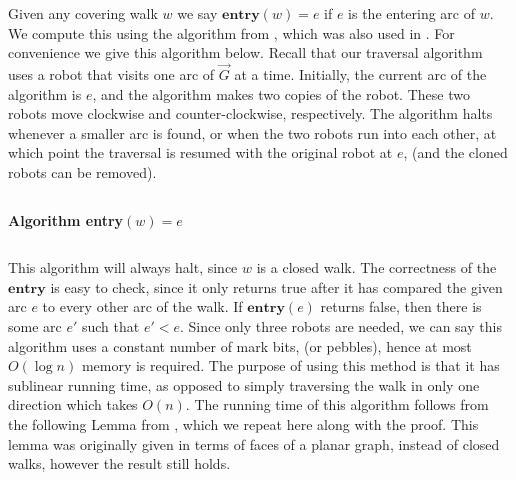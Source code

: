 \documentclass[12pt,letterpaper,oneside]{book}
\newcommand{\suc}{\textbf{succ}}
\newcommand{\pred}{\textbf{pred}}
\newcommand{\entry}{\textbf{entry}}
\begin{document}
Given any covering walk $w$ we say $\entry(w)=e$ if $e$ is the entering 
arc of $w$.  We compute this using the algorithm from \cite{BM}, which was also used in \cite{CDKOSU}.  For convenience 
we give this algorithm below.  Recall that our traversal algorithm uses a robot that visits 
one arc of $\vec{G}$ at a time.  Initially, the current arc of the algorithm is $e$, and the algorithm makes two 
copies of the robot.  These two robots move clockwise and counter-clockwise, respectively.  The algorithm halts whenever a smaller 
arc is found, or when the two robots run into each other, at which point the traversal is resumed with 
the original robot at $e$, (and the cloned robots can be removed).   
 



\begin{center}\begin{tabular*}{\textwidth}{c}\hline\end{tabular*}\end{center}
\noindent \textbf{Algorithm entry}$(w)=e$
\begin{algorithmic}[1]
\REPEAT
 \STATE {$e^{cw} \leftarrow \pred(e^{cw})$}
  \ELSE
     \ENDIF
\ENDIF 


 \STATE {$e^{ccw} \leftarrow \suc(e^{ccw})$}
  \ELSE
      \ENDIF
   \ENDIF 

\end{algorithmic}
\begin{center}\begin{tabular*}{\textwidth}{c}\hline\end{tabular*}\end{center}

This algorithm will always halt, since $w$ is a closed walk.  
The correctness of the $\entry$ is easy to check, since it only returns true after it has compared the given arc 
$e$ to every other arc of the walk.  If $\entry(e)$ returns false, then there is some arc $e'$ such that $e'<e$.  Since only three 
robots are needed, we can say this algorithm uses a constant number of mark bits, (or pebbles), hence at most 
$O(\log n)$ memory is required.  The purpose of using this method is that it has sublinear running time, as opposed to 
simply traversing the walk in only one direction which takes $O(n)$.  The running time of this algorithm follows from 
the following Lemma from \cite{BM}, which we repeat here along with the proof.  This lemma was originally given in terms of 
faces of a planar graph, instead of closed walks, however the result still holds.  
\end{document}
